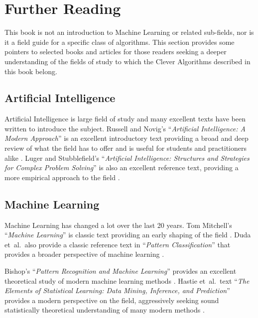 
\section{Further Reading} 
\label{intro:furtherreading}
This book is not an introduction to Machine Learning or related sub-fields, nor is it a field guide for a specific class of algorithms. This section provides some pointers to selected books and articles for those readers seeking a deeper understanding of the fields of study to which the Clever Algorithms described in this book belong.

\subsection{Artificial Intelligence}
Artificial Intelligence is large field of study and many excellent texts have been written to introduce the subject. Russell and Novig's ``\emph{Artificial Intelligence: A Modern Approach}'' is an excellent introductory text providing a broad and deep review of what the field has to offer and is useful for students and practitioners alike \cite{Russell2009}. Luger and Stubblefield's ``\emph{Artificial Intelligence: Structures and Strategies for Complex Problem Solving}'' is also an excellent reference text, providing a more empirical approach to the field \cite{Luger1993}.

\subsection{Machine Learning}
Machine Learning has changed a lot over the last 20 years. 
Tom Mitchell's ``\emph{Machine Learning}'' is classic text providing an early shaping of the field \cite{Mitchell1997}.
Duda et~al.\ also provide a classic reference text in ``\emph{Pattern Classification}'' that provides a broader perspective of machine learning \cite{Duda2001}.

Bishop's ``\emph{Pattern Recognition and Machine Learning}'' provides an excellent theoretical study of modern machine learning methods \cite{Bishop2007}.
Hastie et~al.\ text ``\emph{The Elements of Statistical Learning: Data Mining, Inference, and Prediction}'' provides a modern perspective on the field, aggressively seeking sound statistically theoretical understanding of many modern methods \cite{Hastie2009}.


